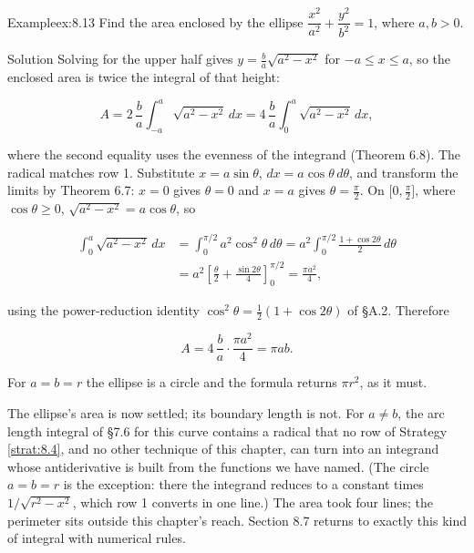 \documentclass[a4paper,12pt,oneside]{memoir}
\begin{document}
\begin{workedexample}
\begin{envexample}{Example}{ex:8.13}{}
Find the area enclosed by the ellipse \(\dfrac{x^{2}}{a^{2}} + \dfrac{y^{2}}{b^{2}} = 1\), where \(a, b > 0\).
\end{envexample}
\begin{envsolution}{Solution}{}{}
Solving for the upper half gives \(y = \tfrac{b}{a}\sqrt{a^{2} - x^{2}}\) for \(-a \le x \le a\), so the enclosed area is twice the integral of that height:

\[ A = 2\,\frac{b}{a}\int_{-a}^{a} \sqrt{a^{2} - x^{2}}\,dx = 4\,\frac{b}{a}\int_{0}^{a} \sqrt{a^{2} - x^{2}}\,dx, \]

where the second equality uses the evenness of the integrand (Theorem 6.8). The radical matches row 1. Substitute \(x = a\sin\theta\), \(dx = a\cos\theta\,d\theta\), and transform the limits by Theorem 6.7: \(x = 0\) gives \(\theta = 0\) and \(x = a\) gives \(\theta = \tfrac{\pi}{2}\). On \(\bigl[0, \tfrac{\pi}{2}\bigr]\), where \(\cos\theta \ge 0\), \(\sqrt{a^{2} - x^{2}} = a\cos\theta\), so

\[ \begin{aligned}
          \int_{0}^{a} \sqrt{a^{2} - x^{2}}\,dx &= \int_{0}^{\pi/2} a^{2}\cos^{2}\theta\,d\theta = a^{2}\int_{0}^{\pi/2} \frac{1 + \cos 2\theta}{2}\,d\theta \\[2pt]
            &= a^{2}\left[\frac{\theta}{2} + \frac{\sin 2\theta}{4}\right]_{0}^{\pi/2} = \frac{\pi a^{2}}{4},
        \end{aligned} \]

using the power-reduction identity \(\cos^{2}\theta = \tfrac{1}{2}(1 + \cos 2\theta)\) of §A.2. Therefore

\[ A = 4\,\frac{b}{a}\cdot\frac{\pi a^{2}}{4} = \pi a b. \]

For \(a = b = r\) the ellipse is a circle and the formula returns \(\pi r^{2}\), as it must. \qedmark
\end{envsolution}
\end{workedexample}
The ellipse’s area is now settled; its boundary length is not. For \(a \ne b\), the arc length integral of §7.6 for this curve contains a radical that no row of Strategy \ref{strat:8.4}, and no other technique of this chapter, can turn into an integrand whose antiderivative is built from the functions we have named. (The circle \(a = b = r\) is the exception: there the integrand reduces to a constant times \(1/\sqrt{r^{2} - x^{2}}\), which row 1 converts in one line.) The area took four lines; the perimeter sits outside this chapter’s reach. Section 8.7 returns to exactly this kind of integral with numerical rules.
\end{document}

